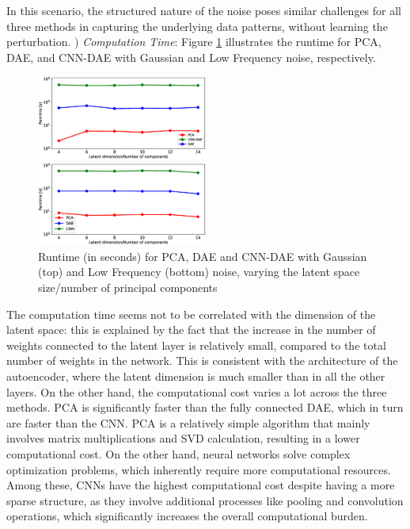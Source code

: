 \documentclass[10pt,conference,compsocconf]{IEEEtran}
\begin{document}
In this scenario, the structured nature of the noise poses similar challenges for all three methods in capturing the underlying data patterns, without learning the perturbation. 
) \textit{Computation Time}: Figure \ref{fig:runtime} illustrates the runtime for PCA, DAE, and CNN-DAE with Gaussian and Low Frequency noise, respectively. 

\begin{figure}[h!]
  \centering
  \includegraphics[width=0.5\textwidth]{foto/runtime_gaussian.eps}

  \includegraphics[width=0.5\textwidth]{foto/runtime_low_freq.eps}
  \caption{Runtime (in seconds) for PCA, DAE and CNN-DAE with Gaussian (top) and Low Frequency (bottom) noise, varying the latent space size/number of principal components}
  \label{fig:runtime}
\end{figure}

The computation time seems not to be correlated with the dimension of the latent space: this is explained by the fact that the increase in the number of weights connected to the latent layer is relatively small, compared to the total number of weights in the network. This is consistent with the architecture of the autoencoder, where the latent dimension is much smaller than in all the other layers. On the other hand, the computational cost varies a lot across the three methods. PCA is significantly faster than the fully connected DAE, which in turn are faster than the CNN. 
PCA is a relatively simple algorithm that mainly involves matrix multiplications and SVD calculation, resulting in a lower computational cost. On the other hand, neural networks solve complex optimization problems, 
which inherently require more computational resources. Among these, CNNs have the highest computational cost despite having a more sparse structure, as they involve additional processes like pooling and  convolution operations, which significantly increases the overall computational burden.
\end{document}
